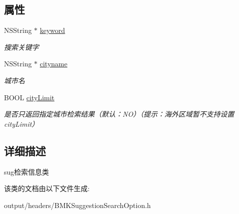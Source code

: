 \subsection*{属性}
\begin{DoxyCompactItemize}
\item 
\hypertarget{interface_b_m_k_suggestion_search_option_a2b769ad03eb52e46d9e14e8c096b6b43}{}N\+S\+String $\ast$ \hyperlink{interface_b_m_k_suggestion_search_option_a2b769ad03eb52e46d9e14e8c096b6b43}{keyword}\label{interface_b_m_k_suggestion_search_option_a2b769ad03eb52e46d9e14e8c096b6b43}

\begin{DoxyCompactList}\small\item\em 搜索关键字 \end{DoxyCompactList}\item 
\hypertarget{interface_b_m_k_suggestion_search_option_a938c2265022ca94d18c636388fc75e68}{}N\+S\+String $\ast$ \hyperlink{interface_b_m_k_suggestion_search_option_a938c2265022ca94d18c636388fc75e68}{cityname}\label{interface_b_m_k_suggestion_search_option_a938c2265022ca94d18c636388fc75e68}

\begin{DoxyCompactList}\small\item\em 城市名 \end{DoxyCompactList}\item 
\hypertarget{interface_b_m_k_suggestion_search_option_a256945a14f6f1d527e6e6fb5fb1cef25}{}B\+O\+O\+L \hyperlink{interface_b_m_k_suggestion_search_option_a256945a14f6f1d527e6e6fb5fb1cef25}{city\+Limit}\label{interface_b_m_k_suggestion_search_option_a256945a14f6f1d527e6e6fb5fb1cef25}

\begin{DoxyCompactList}\small\item\em 是否只返回指定城市检索结果（默认：\+N\+O）（提示：海外区域暂不支持设置city\+Limit） \end{DoxyCompactList}\end{DoxyCompactItemize}


\subsection{详细描述}
sug检索信息类 

该类的文档由以下文件生成\+:\begin{DoxyCompactItemize}
\item 
output/headers/B\+M\+K\+Suggestion\+Search\+Option.\+h\end{DoxyCompactItemize}

